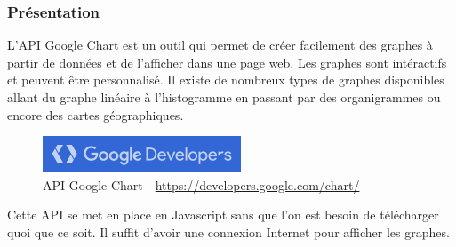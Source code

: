 \subsubsection{Présentation}
L'API Google Chart est un outil qui permet de créer facilement des graphes à partir de données et de l'afficher dans une page web. Les graphes sont intéractifs et peuvent être personnalisé. Il existe de nombreux types de graphes disponibles allant du graphe linéaire à l'histogramme en passant par des organigrammes ou encore des cartes géographiques.\\
\begin{figure}[H]
  \center
  \includegraphics[scale=0.5]{../graph/googleAPI.png}
  \caption{API Google Chart - \url{https://developers.google.com/chart/}}
\end{figure}

Cette API se met en place en Javascript sans que l'on est besoin de télécharger quoi que ce soit. Il suffit d'avoir une connexion Internet pour afficher les graphes.

